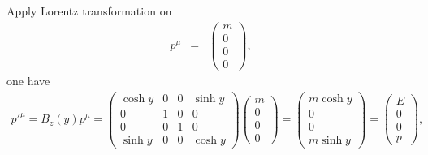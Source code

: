 \documentclass[11pt]{article}
\begin{document}
  \section{ }
  Apply Lorentz transformation on
  \begin{eqnarray}
    p^\mu &=& 
    \begin{pmatrix}
      m \\ 0 \\ 0 \\ 0
    \end{pmatrix},
  \end{eqnarray}
one have
  \begin{eqnarray}
    {p'}^\mu = B_z(y) p^\mu =
    \begin{pmatrix}
        \cosh y & 0 & 0 & \sinh y \\
        0 & 1 & 0 & 0 \\
        0 & 0 & 1 & 0 \\
        \sinh y & 0 & 0 & \cosh y
    \end{pmatrix}
    \begin{pmatrix}
        m \\ 0 \\ 0 \\ 0
      \end{pmatrix}
    =
    \begin{pmatrix}
      m \cosh y \\ 0 \\ 0 \\ m \sinh y 
    \end{pmatrix}
    =
    \begin{pmatrix}
     E \\ 0 \\ 0 \\ p
    \end{pmatrix},
  \end{eqnarray}
\end{document}
